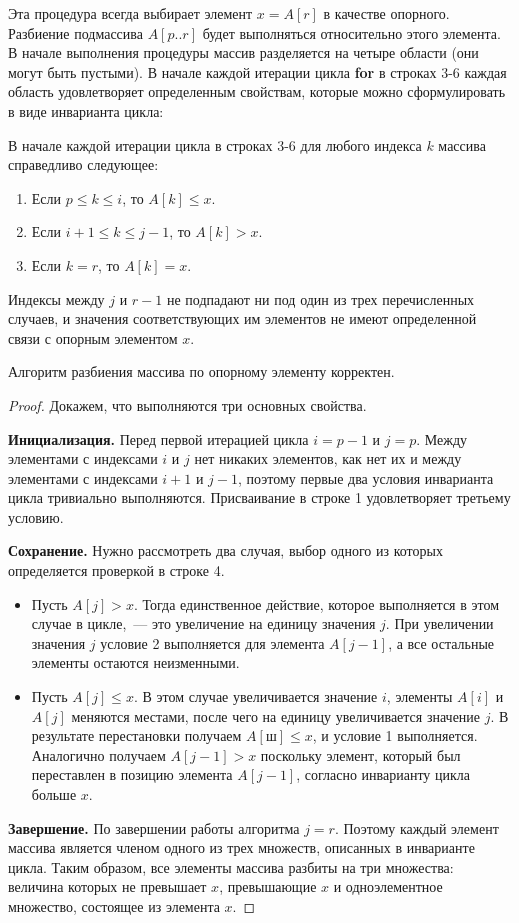 \documentclass[a4paper,12pt]{article}
\begin{document}
Эта процедура всегда выбирает элемент $x = A[r]$ в качестве опорного. Разбиение подмассива $A[p..r]$ будет выполняться относительно этого элемента. В начале выполнения процедуры массив разделяется на четыре области (они могут быть пустыми). В начале каждой итерации цикла \textbf{for} в строках 3-6 каждая область удовлетворяет определенным свойствам, которые можно сформулировать в виде инварианта цикла:

В начале каждой итерации цикла в строках 3-6 для любого индекса $k$ массива справедливо следующее:
\begin{enumerate}
	\item Если $p \leqslant k \leqslant i$, то $A[k] \leqslant x$.
	\item Если $i + 1 \leqslant k \leqslant j - 1$, то $A[k] > x$.
	\item Если $k = r$, то $A[k] = x$.
\end{enumerate}

Индексы между $j$ и $r - 1$ не подпадают ни под один из трех перечисленных случаев, и значения соответствующих им элементов не имеют определенной связи с опорным элементом $x$.

\begin{theorem}
	Алгоритм разбиения массива по опорному элементу корректен.
\end{theorem}
\begin{proof}
	Докажем, что выполняются три основных свойства.
	
	\textbf{Инициализация.} Перед первой итерацией цикла $i = p - 1$ и $j = p$. Между элементами с индексами $i$ и $j$ нет никаких элементов, как нет их и между элементами с индексами $i + 1$ и $j - 1$, поэтому первые два условия 
	инварианта цикла тривиально выполняются. Присваивание в строке 1 удовлетворяет третьему условию.
	
	\textbf{Сохранение.} Нужно рассмотреть два случая, выбор 
	одного из которых определяется проверкой в строке 4. 
	\begin{itemize}
		\item Пусть $A[j] > x$. Тогда единственное действие, которое выполняется в этом случае в цикле,~--- это увеличение на единицу значения $j$. При 
		увеличении значения $j$ условие 2 выполняется для элемента  $A[j - 1]$, а все остальные элементы остаются неизменными.
		\item Пусть $A[j] \leqslant x$. В этом случае увеличивается значение $i$, элементы $A[i]$ и $A[j]$ меняются местами, после чего на единицу увеличивается значение $j$. В результате перестановки получаем $A[ ш] \leqslant x$, и условие 1 выполняется. Аналогично
		получаем $A[j - 1] > x$ поскольку элемент, который был переставлен в позицию элемента $A[j - 1]$, согласно инварианту цикла больше $x$.
	\end{itemize}
	
	\textbf{Завершение.} По завершении работы алгоритма $j = r$. Поэтому каждый элемент массива является членом одного из трех множеств, описанных в инварианте цикла. Таким образом, все элементы массива разбиты на три множества: величина которых не превышает $x$, превышающие $x$ и одноэлементное множество, состоящее из элемента $x$.
\end{proof}
\end{document}
